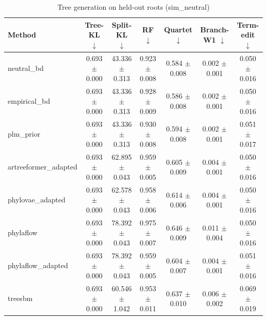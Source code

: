 \begin{table}[t]\centering
\caption{Tree generation on held-out roots (sim_neutral)}
\begin{tabular}{lcccccc}
\toprule
Method & Tree-KL $\downarrow$ & Split-KL $\downarrow$ & RF $\downarrow$ & Quartet $\downarrow$ & Branch-W1 $\downarrow$ & Term-edit $\downarrow$ \\
\midrule
neutral\_bd & 0.693 $\pm$ 0.000 & 43.336 $\pm$ 0.313 & 0.923 $\pm$ 0.008 & 0.584 $\pm$ 0.008 & 0.002 $\pm$ 0.001 & 0.050 $\pm$ 0.016 \\
empirical\_bd & 0.693 $\pm$ 0.000 & 43.336 $\pm$ 0.313 & 0.928 $\pm$ 0.009 & 0.586 $\pm$ 0.008 & 0.002 $\pm$ 0.001 & 0.050 $\pm$ 0.016 \\
plm\_prior & 0.693 $\pm$ 0.000 & 43.336 $\pm$ 0.313 & 0.930 $\pm$ 0.008 & 0.594 $\pm$ 0.008 & 0.002 $\pm$ 0.001 & 0.051 $\pm$ 0.017 \\
artreeformer\_adapted & 0.693 $\pm$ 0.000 & 62.895 $\pm$ 0.043 & 0.959 $\pm$ 0.005 & 0.605 $\pm$ 0.009 & 0.004 $\pm$ 0.001 & 0.050 $\pm$ 0.016 \\
phylovae\_adapted & 0.693 $\pm$ 0.000 & 62.578 $\pm$ 0.043 & 0.958 $\pm$ 0.006 & 0.614 $\pm$ 0.006 & 0.004 $\pm$ 0.001 & 0.050 $\pm$ 0.016 \\
phylaflow & 0.693 $\pm$ 0.000 & 78.392 $\pm$ 0.043 & 0.975 $\pm$ 0.007 & 0.646 $\pm$ 0.009 & 0.011 $\pm$ 0.004 & 0.050 $\pm$ 0.016 \\
phylaflow\_adapted & 0.693 $\pm$ 0.000 & 78.392 $\pm$ 0.043 & 0.959 $\pm$ 0.005 & 0.604 $\pm$ 0.007 & 0.004 $\pm$ 0.001 & 0.051 $\pm$ 0.016 \\
treesbm & 0.693 $\pm$ 0.000 & 60.546 $\pm$ 1.042 & 0.953 $\pm$ 0.011 & 0.637 $\pm$ 0.010 & 0.006 $\pm$ 0.002 & 0.069 $\pm$ 0.019 \\
\bottomrule
\end{tabular}
\end{table}